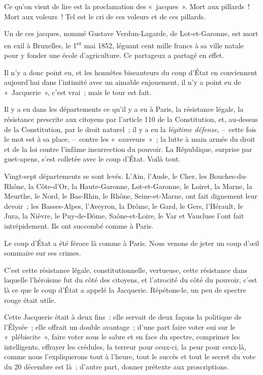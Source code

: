 \documentclass[french,twoside]{book} %
\begin{document}
\noindent Ce qu’on vient de lire est la proclamation des « jacques ». Mort aux pillards ! Mort aux voleurs ! Tel est le cri de ces voleurs et de ces pillards.\par
Un de ces jacques, nommé Gustave Verdun-Lagarde, de Lot-et-Garonne, est mort en exil à Bruxelles, le 1\textsuperscript{er} mai 1852, léguant cent mille francs à sa ville natale pour y fonder une école d’agriculture. Ce partageux a partagé en effet.\par
Il n’y a donc point eu, et les honnêtes biseauteurs du coup d’État en conviennent aujourd’hui dans l’intimité avec un aimable enjouement, il n’y a point eu de « Jacquerie », c’est vrai ; mais le tour est fait.\par
Il y a eu dans les départements ce qu’il y a eu à Paris, la résistance légale, la résistance prescrite aux citoyens par l’article 110 de la Constitution, et, au-dessus de la Constitution, par le droit naturel ; il y a eu la \emph{légitime défense}, – cette fois le mot est à sa place, – contre les « sauveurs » ; la lutte à main armée du droit et de la loi contre l’infâme insurrection du pouvoir. La République, surprise par guet-apens, s’est colletée avec le coup d’État. Voilà tout.\par
Vingt-sept départements se sont levés. L’Ain, l’Aude, le Cher, les Bouches-du-Rhône, la Côte-d’Or, la Haute-Garonne, Lot-et-Garonne, le Loiret, la Marne, la Meurthe, le Nord, le Bas-Rhin, le Rhône, Seine-et-Marne, ont fait dignement leur devoir ; les Basses-Alpes, l’Aveyron, la Drôme, le Gard, le Gers, l’Hérault, le Jura, la Nièvre, le Puy-de-Dôme, Saône-et-Loire, le Var et Vaucluse l’ont fait intrépidement. Ils ont succombé comme à Paris.\par
Le coup d’État a été féroce là comme à Paris. Nous venons de jeter un coup d’œil sommaire sur ses crimes.\par
C’est cette résistance légale, constitutionnelle, vertueuse, cette résistance dans laquelle l’héroïsme fut du côté des citoyens, et l’atrocité du côté du pouvoir, c’est là ce que le coup d’État a appelé la Jacquerie. Répétons-le, un peu de spectre rouge était utile.\par
Cette Jacquerie était à deux fins : elle servait de deux façons la politique de l’Élysée ; elle offrait un double avantage ; d’une part faire voter oui sur le « plébiscite », faire voter sous le sabre et en face du spectre, comprimer les intelligents, effrayer les crédules, la terreur pour ceux-ci, la peur pour ceux-là, comme nous l’expliquerons tout à l’heure, tout le succès et tout le secret du vote du 20 décembre est là ; d’autre part, donner prétexte aux proscriptions.\par
\end{document}
